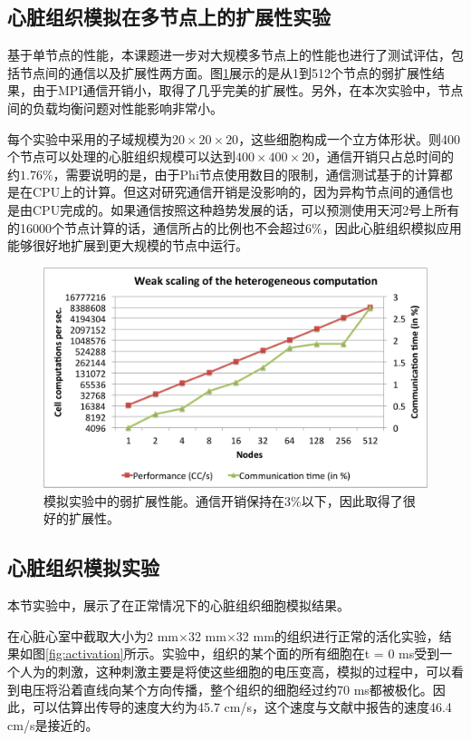 \subsection{心脏组织模拟在多节点上的扩展性实验}
基于单节点的性能，本课题进一步对大规模多节点上的性能也进行了测试评估，包括节点间的通信以及扩展性两方面。图\ref{weak_scale}展示的是从1到512个节点的弱扩展性结果，由于MPI通信开销小，取得了几乎完美的扩展性。另外，在本次实验中，节点间的负载均衡问题对性能影响非常小。

每个实验中采用的子域规模为$20\times20\times20$，这些细胞构成一个立方体形状。则400个节点可以处理的心脏组织规模可以达到$400\times400\times20$，通信开销只占总时间的约$1.76\%$，需要说明的是，由于Phi节点使用数目的限制，通信测试基于的计算都是在CPU上的计算。但这对研究通信开销是没影响的，因为异构节点间的通信也是由CPU完成的。如果通信按照这种趋势发展的话，可以预测使用天河2号上所有的16000个节点计算的话，通信所占的比例也不会超过$6\%$，因此心脏组织模拟应用能够很好地扩展到更大规模的节点中运行。

\begin{figure}
 \includegraphics[width=\linewidth]{figs/weakscaling.pdf}
  \caption{模拟实验中的弱扩展性能。通信开销保持在$3\%$以下，因此取得了很好的扩展性。}
  \label{weak_scale}
\end{figure}

\subsection{心脏组织模拟实验}
本节实验中，展示了在正常情况下的心脏组织细胞模拟结果。

在心脏心室中截取大小为2 mm$\times$32 mm$\times$32 mm的组织进行正常的活化实验，结果如图\ref{fig:activation}所示。实验中，组织的某个面的所有细胞在t = 0 ms受到一个人为的刺激，这种刺激主要是将使这些细胞的电压变高，模拟的过程中，可以看到电压将沿着直线向某个方向传播，整个组织的细胞经过约70 ms都被极化。因此，可以估算出传导的速度大约为45.7 cm/s，这个速度与文献中报告的速度46.4 cm/s是接近的。

